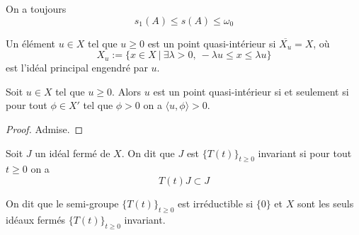 \begin{remark}
    On a toujours 
    \begin{equation*}
        s_1(A) \leq s(A) \leq \omega_0
    \end{equation*}
\end{remark}


%    

\begin{definition}
    Un élément $u \in X$ tel que $u \geq 0$ est un 
    \textcolor{astral}{point quasi-intérieur} si $\overline{X_u}=X$, où
    \begin{equation*}
        X_u := \big\{ x \in X \ | \ \exists \lambda >0, \ -\lambda u \leq x \leq \lambda u \big\}
    \end{equation*}
    est l'idéal principal engendré par $u$.
\end{definition}

\begin{proposition}\label{prop_pts_quasi_inter}
    Soit $u \in X$ tel que $u \geq 0$. Alors $u$ est un point quasi-intérieur si et seulement si pour tout $\phi \in X'$ tel que $\phi >0$ on a $\langle u,\phi \rangle >0$.
\end{proposition}

\begin{proof}
    Admise.
\end{proof}

\begin{definition}
    Soit $J$ un idéal fermé de $X$. On dit que $J$ est 
    \textcolor{astral}{$\big\{T(t)\big\}_{t \geq 0}$ invariant} si pour tout $t \geq 0$ on a 
    \begin{equation*}
        T(t)J \subset J
    \end{equation*}
\end{definition}

\begin{definition}
    On dit que le semi-groupe $\big\{T(t)\big\}_{t \geq 0}$ est \textcolor{astral}{irréductible} si $\{0\}$ et $X$ sont les seuls idéaux fermés $\big\{T(t)\big\}_{t \geq 0}$ invariant.
\end{definition}

